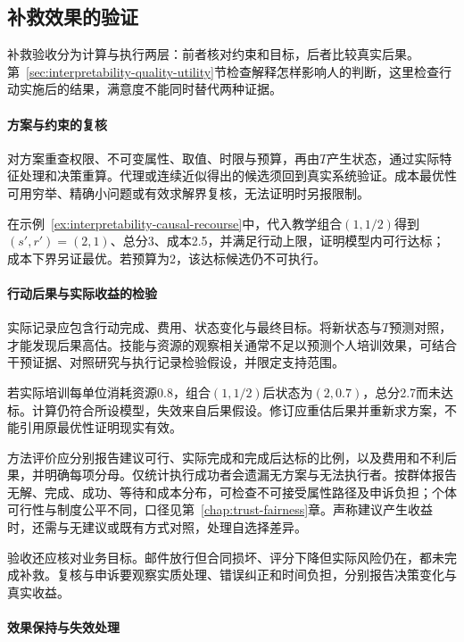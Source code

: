 \subsection{补救效果的验证}
\label{sec:interpretability-recourse-validation}

补救验收分为计算与执行两层：前者核对约束和目标，后者比较真实后果。第~\ref{sec:interpretability-quality-utility}节检查解释怎样影响人的判断，这里检查行动实施后的结果，满意度不能同时替代两种证据。

\paragraph{方案与约束的复核}

对方案重查权限、不可变属性、取值、时限与预算，再由$T$产生状态，通过实际特征处理和决策重算。代理或连续近似得出的候选须回到真实系统验证。成本最优性可用穷举、精确小问题或有效求解界复核，无法证明时另报限制。

在示例~\ref{ex:interpretability-causal-recourse}中，代入教学组合$(1,1/2)$得到$(s',r')=(2,1)$、总分3、成本2.5，并满足行动上限，证明模型内可行达标；成本下界另证最优。若预算为2，该达标候选仍不可执行。

\paragraph{行动后果与实际收益的检验}

实际记录应包含行动完成、费用、状态变化与最终目标。将新状态与$T$预测对照，才能发现后果高估。技能与资源的观察相关通常不足以预测个人培训效果，可结合干预证据、对照研究与执行记录检验假设，并限定支持范围。

若实际培训每单位消耗资源0.8，组合$(1,1/2)$后状态为$(2,0.7)$，总分2.7而未达标。计算仍符合所设模型，失效来自后果假设。修订应重估后果并重新求方案，不能引用原最优性证明现实有效。

方法评价应分别报告建议可行、实际完成和完成后达标的比例，以及费用和不利后果，并明确每项分母。仅统计执行成功者会遗漏无方案与无法执行者。按群体报告无解、完成、成功、等待和成本分布，可检查不可接受属性路径及申诉负担；个体可行性与制度公平不同，口径见第~\ref{chap:trust-fairness}章。声称建议产生收益时，还需与无建议或既有方式对照，处理自选择差异。

验收还应核对业务目标。邮件放行但合同损坏、评分下降但实际风险仍在，都未完成补救。复核与申诉要观察实质处理、错误纠正和时间负担，分别报告决策变化与真实收益。

\paragraph{效果保持与失效处理}

